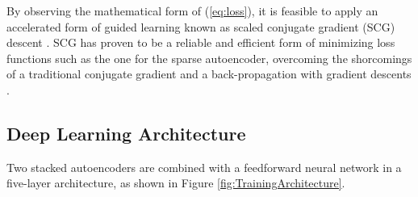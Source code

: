 \documentclass[a4paper]{article}
\begin{document}
By observing the mathematical form of (\ref{eq:loss}), it is feasible to apply
an accelerated form of guided learning known as scaled conjugate gradient (SCG)
descent \cite{moller1993scaled}. SCG has proven to be a reliable and efficient
form of minimizing loss functions such as the one for the sparse autoencoder,
overcoming the shorcomings of a traditional conjugate gradient and
a back-propagation with gradient descents \cite{le2013building}. 


\subsection{Deep Learning Architecture}

Two stacked autoencoders are combined with a feedforward neural network in a
five-layer architecture, as shown in Figure \ref{fig:TrainingArchitecture}. 
\end{document}
